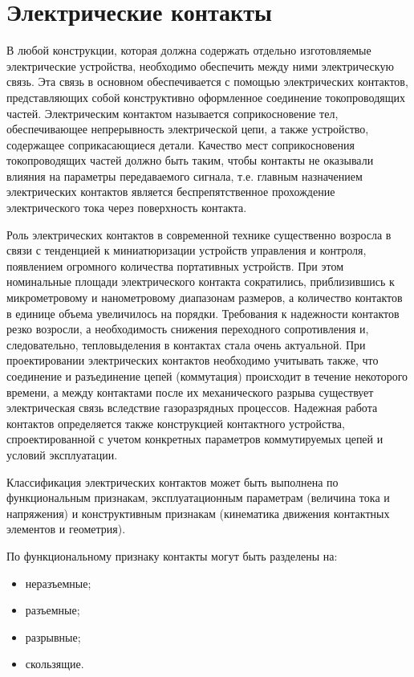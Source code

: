 \section{Электрические контакты }

В любой конструкции, которая должна содержать отдельно изготовляемые электрические устройства, необходимо обеспечить между ними электрическую связь. Эта связь в основном обеспечивается с помощью электрических контактов, представляющих собой конструктивно оформленное соединение токопроводящих частей. Электрическим контактом называется соприкосновение тел, обеспечивающее непрерывность электрической цепи, а также устройство, содержащее соприкасающиеся детали. Качество мест соприкосновения токопроводящих частей должно быть таким, чтобы контакты не оказывали влияния на параметры передаваемого сигнала, т.е. главным назначением электрических контактов является беспрепятственное прохождение электрического тока через поверхность контакта.

Роль электрических контактов в современной технике существенно возросла в связи с тенденцией к миниатюризации устройств управления и контроля, появлением огромного количества портативных устройств. При этом номинальные площади электрического контакта сократились, приблизившись к микрометровому и нанометровому диапазонам размеров, а количество контактов в единице объема увеличилось на порядки. Требования к надежности контактов резко возросли, а необходимость снижения переходного сопротивления и, следовательно, тепловыделения в контактах стала очень актуальной.
При проектировании электрических контактов необходимо учитывать также, что соединение и разъединение цепей (коммутация) происходит в течение некоторого времени, а между контактами после их механического разрыва существует электрическая связь вследствие газоразрядных процессов. Надежная работа контактов определяется также конструкцией контактного устройства, спроектированной с учетом конкретных параметров коммутируемых цепей и условий эксплуатации.

Классификация электрических контактов может быть выполнена по функциональным признакам, эксплуатационным параметрам (величина тока и напряжения) и конструктивным признакам (кинематика движения контактных элементов и геометрия).

По функциональному признаку контакты могут быть разделены на:
\begin{itemize}
\item неразъемные;
\item разъемные;
\item разрывные;
\item скользящие.
\end{itemize}

